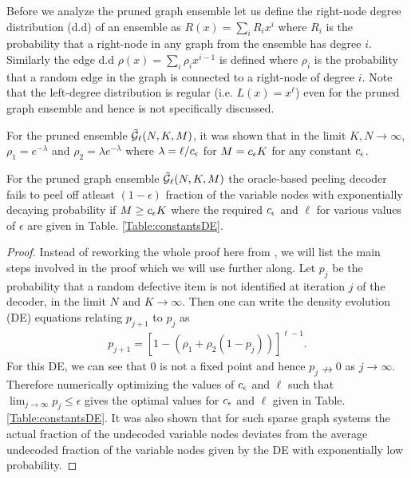 Before we analyze the pruned graph ensemble let us define the right-node degree distribution (d.d) of an ensemble as $R(x)=\sum_{i}R_i x^i$ where $R_i$ is the probability that a right-node in any graph from the ensemble has degree $i$. Similarly the edge d.d $\rho(x)=\sum_{i}\rho_ix^{i-1}$ is defined where $\rho_i$ is the probability that a random edge in the graph is connected to a right-node of degree $i$. Note that the left-degree distribution is regular (i.e. $L(x)=x^\ell$) even for the pruned graph ensemble and hence is not specifically discussed.

\begin{lemma}
\label{Lem:EdgeddSAFFRON}
For the pruned ensemble $\tilde{\mathcal{G}}_{\ell}(N,K,M)$, it was shown that in the limit $K,N\rightarrow\infty$, $\rho_{1}=e^{-\lambda}$ and $\rho_{2}=\lambda e^{-\lambda}$ where $\lambda=\ell/c_{\epsilon}$ for $M=c_{\epsilon} K$ for any constant $c_{\epsilon}$. 
\end{lemma}

\begin{lemma}
\label{Lem:PeelingAnalysisLeftRegular}
For the pruned graph ensemble $\tilde{\mathcal{G}}_{\ell}(N, K,M)$ the oracle-based peeling decoder fails to peel off atleast $(1-\epsilon)$ fraction of the variable nodes with exponentially decaying probability if $M\geq c_{\epsilon} K$ where the required $c_{\epsilon}$ and $\ell$ for various values of $\epsilon$ are given in Table. \ref{Table:constantsDE}.
\end{lemma}
\begin{proof}
Instead of reworking the whole proof here from \cite{lee2015saffron}, we will list the main steps involved in the proof which we will use further along. Let $p_j$ be the probability that a random defective item is not identified at iteration $j$ of the decoder, in the limit $N \text{ and } K\rightarrow \infty$. Then one can write the density evolution (DE) equations relating $p_{j+1}$ to $p_{j}$ as 
\begin{align*}
p_{j+1}=\left[1-(\rho_1+\rho_2(1-p_j))\right]^{\ell-1}.
\end{align*}
For this DE, we can see that $0$ is not a fixed point and hence $p_j\nrightarrow 0$ as $j\rightarrow\infty$. Therefore numerically optimizing the values of $c_{\epsilon}$ and $\ell$ such that $\lim_{j\rightarrow\infty}p_j\leq \epsilon$ gives the optimal values for $c_{\epsilon}$ and $\ell$ given in Table. \ref{Table:constantsDE}. It was also shown \cite{lee2015saffron,richardson2008modern} that for such sparse graph systems the actual fraction of the undecoded variable nodes deviates from the average undecoded fraction of the variable nodes given by the DE with exponentially low probability. 
\end{proof}

